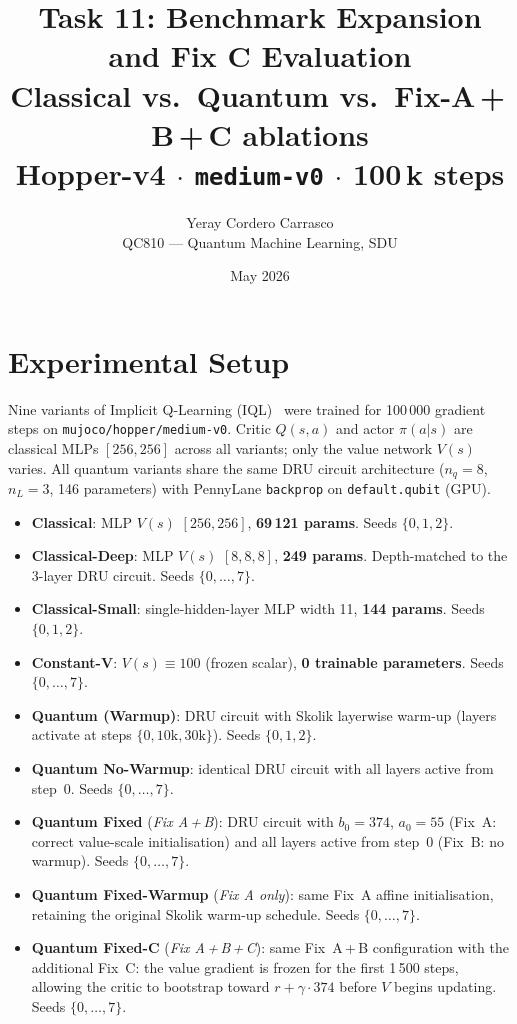 \documentclass[10pt,a4paper]{article}
\title{\textbf{Task 11: Benchmark Expansion and Fix C Evaluation}\\
  \large Classical vs.\ Quantum vs.\ Fix-A\,+\,B\,+\,C ablations\\
  Hopper-v4 $\cdot$ \texttt{medium-v0} $\cdot$ 100\,k steps}
\author{Yeray Cordero Carrasco \\ QC810 --- Quantum Machine Learning, SDU}
\date{May 2026}
\begin{document}
\maketitle
\thispagestyle{empty}

\section{Experimental Setup}

Nine variants of Implicit Q-Learning (IQL)~\cite{kostrikov2021} were trained
for 100\,000 gradient steps on \texttt{mujoco/hopper/medium-v0}.
Critic $Q(s,a)$ and actor $\pi(a|s)$ are classical MLPs $[256,256]$ across all
variants; only the value network $V(s)$ varies. All quantum variants share the
same DRU circuit architecture ($n_q=8$, $n_L=3$, 146 parameters) with
PennyLane \texttt{backprop} on \texttt{default.qubit} (GPU).

\begin{itemize}
  \item \textbf{Classical}: MLP $V(s)$ $[256,256]$, \textbf{69\,121 params}.
        Seeds $\{0,1,2\}$.
  \item \textbf{Classical-Deep}: MLP $V(s)$ $[8,8,8]$, \textbf{249 params}.
        Depth-matched to the 3-layer DRU circuit. Seeds $\{0,\ldots,7\}$.
  \item \textbf{Classical-Small}: single-hidden-layer MLP width 11,
        \textbf{144 params}. Seeds $\{0,1,2\}$.
  \item \textbf{Constant-V}: $V(s)\equiv100$ (frozen scalar),
        \textbf{0 trainable parameters}. Seeds $\{0,\ldots,7\}$.
  \item \textbf{Quantum (Warmup)}: DRU circuit with Skolik layerwise warm-up
        (layers activate at steps $\{0,10\text{k},30\text{k}\}$). Seeds $\{0,1,2\}$.
  \item \textbf{Quantum No-Warmup}: identical DRU circuit with all layers
        active from step~0. Seeds $\{0,\ldots,7\}$.
  \item \textbf{Quantum Fixed} (\emph{Fix A\,+\,B}): DRU circuit with
        $b_0=374$, $a_0=55$ (Fix~A: correct value-scale initialisation) and
        all layers active from step~0 (Fix~B: no warmup). Seeds $\{0,\ldots,7\}$.
  \item \textbf{Quantum Fixed-Warmup} (\emph{Fix A only}): same Fix~A
        affine initialisation, retaining the original Skolik warm-up schedule.
        Seeds $\{0,\ldots,7\}$.
  \item \textbf{Quantum Fixed-C} (\emph{Fix A\,+\,B\,+\,C}): same Fix~A\,+\,B
        configuration with the additional Fix~C: the value gradient is frozen
        for the first 1\,500 steps, allowing the critic to bootstrap toward
        $r+\gamma\cdot374$ before $V$ begins updating. Seeds $\{0,\ldots,7\}$.
\end{itemize}
\end{document}
